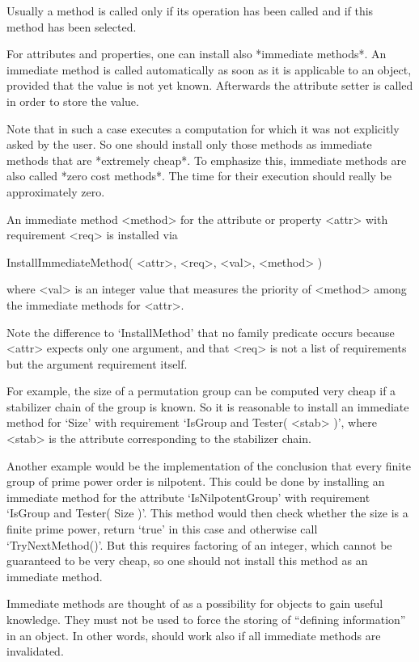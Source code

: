 Usually a method is called only if its operation has been called
and if this method has been selected.

For attributes and properties, one can install also *immediate methods*.
An immediate method is called automatically as soon as it is applicable
to an object, provided that the value is not yet known.
Afterwards the attribute setter is called in order to store the value.

Note that in such a case {\GAP} executes a computation for which
it was not explicitly asked by the user.
So one should install only those methods as immediate methods
that are *extremely cheap*.
To emphasize this, immediate methods are also called *zero cost methods*.
The time for their execution should really be approximately zero.

An immediate method <method> for the attribute or property <attr>
with requirement <req> is installed via

\>InstallImmediateMethod( <attr>, <req>, <val>, <method> )

where <val> is an integer value that measures the priority of <method>
among the immediate methods for <attr>.

Note the difference to `InstallMethod' that no family predicate occurs
because <attr> expects only one argument,
and that <req> is not a list of requirements but the argument requirement
itself.

For example, the size of a permutation group can be computed very cheap
if a stabilizer chain of the group is known.
So it is reasonable to install an immediate method for `Size' with
requirement `IsGroup and Tester( <stab> )',
where <stab> is the attribute corresponding to the stabilizer chain.

Another example would be the implementation of the conclusion that
every finite group of prime power order is nilpotent.
This could be done by installing an immediate method for the attribute
`IsNilpotentGroup' with requirement `IsGroup and Tester( Size )'.
This method would then check whether the size is a finite prime power,
return `true' in this case and otherwise call `TryNextMethod()'.
But this requires factoring of an integer,
which cannot be guaranteed to be very cheap,
so one should not install this method as an immediate method.

Immediate methods are thought of as a possibility for objects to gain
useful knowledge.
They must not be used to force the storing of ``defining information''
in an object.
In other words, {\GAP} should work also if all immediate methods are
invalidated.

